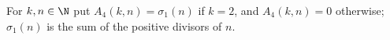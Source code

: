 For $k,n\in\N$ put $A_4(k,n)=\sigma_1(n)$ if $k=2$, and $A_4(k,n)=0$ otherwise; $\sigma_1(n)$ is the sum of the positive divisors of $n$.
